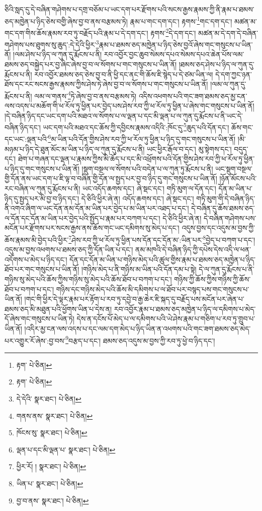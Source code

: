 ཅིའི་སླད་དུ་དེ་བཞིན་གཤེགས་པ་དགྲ་བཅོམ་པ་ཡང་དག་པར་རྫོགས་པའི་སངས་རྒྱས་རྣམས་ཀྱི་ནི་རྣམ་པ་ཐམས་ཅད་མཁྱེན་པ་ཉིད་ཅེས་བགྱི་ཞེས་བྱ་བ་ནས་བརྩམས་ཏེ། རྣམ་པ་གང་དག་དང་། རྟགས་\footnote{རྟག་  པེ་ཅིན། }གང་དག་དང་། མཚན་མ་གང་དག་གིས་ཆོས་རྣམས་རབ་ཏུ་བརྗོད་པའི་རྣམ་པ་དེ་དག་དང་། རྟགས་\footnote{རྟག་  པེ་ཅིན། }དེ་དག་དང་། མཚན་མ་དེ་དག་དེ་བཞིན་གཤེགས་པས་ཐུགས་སུ་ཆུད་:དེ་དེའི་ཕྱིར་\footnote{དེ་དེའི་  སྣར་ཐང་།  པེ་ཅིན། }རྣམ་པ་ཐམས་ཅད་མཁྱེན་པ་ཉིད་ཅེས་བྱའོ་ཞེས་གང་གསུངས་པ་ཡིན་ནོ། །ལམ་ཤེས་པ་ཉིད་ལ་ཀུན་དུ་རྨོངས་པ་ནི། རབ་འབྱོར་བྱང་ཆུབ་སེམས་དཔའ་སེམས་དཔའ་ཆེན་པོས་ལམ་ཐམས་ཅད་བསྐྱེད་པར་བྱ་ཞིང་ཞེས་བྱ་བ་ལ་སོགས་པ་གང་གསུངས་པ་ཡིན་ནོ། །ཐམས་ཅད་ཤེས་པ་ཉིད་ལ་ཀུན་དུ་རྨོངས་པ་ནི། རབ་འབྱོར་ཐམས་ཅད་ཅེས་བྱ་བ་ནི་ཕྱི་དང་ནང་གི་ཆོས་ཇི་སྙེད་པ་དེ་ཙམ་ཡིན་ལ། དེ་དག་ཀྱང་ཉན་ཐོས་དང་རང་སངས་རྒྱས་རྣམས་ཀྱིས་ཤེས་ཏེ་ཞེས་བྱ་བ་ལ་སོགས་པ་གང་གསུངས་པ་ཡིན་ནོ། །ལམ་ལ་ཀུན་དུ་རྨོངས་པ་ནི། ལམ་ལ་གནས་\footnote{གནས་ནས་  སྣར་ཐང་།  པེ་ཅིན། }ཏེ་ཞེས་བྱ་བ་ནས་བརྩམས་ཏེ། འདིས་འཕགས་པའི་གང་ཟག་ཐམས་ཅད་མྱ་ངན་ལས་འདས་པ་མཆོག་གི་ཕ་རོལ་ཏུ་ཕྱིན་པར་བྱེད་པས་ཤེས་རབ་ཀྱི་ཕ་རོལ་ཏུ་ཕྱིན་པ་ཞེས་གང་གསུངས་པ་ཡིན་ནོ། །དེ་བཞིན་ཉིད་དང་ཡང་དག་པའི་མཐའ་ལ་སོགས་པ་ལ་ལྡན་པ་དང་མི་ལྡན་པ་ལ་ཀུན་དུ་རྨོངས་པ་ནི་ཡང་དེ་བཞིན་ཉིད་དང་། ཡང་དག་པའི་མཐའ་དང་ཆོས་ཀྱི་དབྱིངས་རྣམས་འདིའི་:ཁོང་དུ་\footnote{ཁོངས་སུ་  སྣར་ཐང་།  པེ་ཅིན། }ཆུད་པའི་དོན་དང་། ཆོས་གང་དང་ཡང་:ལྡན་པའི་\footnote{ལྡན་པ་དང་མི་ལྡན་པ་  སྣར་ཐང་།  པེ་ཅིན། }མ་ཡིན་པའི་དོན་གྱིས་ཤེས་རབ་ཀྱི་ཕ་རོལ་ཏུ་ཕྱིན་པ་ཉིད་དུ་གང་གསུངས་པ་ཡིན་ནོ། །མི་མཉམ་པ་ཉིད་དེ་ཐུན་མོང་མ་ཡིན་པ་ཉིད་ལ་ཀུན་དུ་རྨོངས་པ་ནི། ཡང་ཕྱིར་རྒོལ་བ་དང་། མུ་སྟེགས་དང་། བདུད་དང་། ཐེག་པ་གཞན་དང་ལྡན་པ་རྣམས་ཀྱིས་མི་ཆོད་པ་དང་མི་འཕྲོགས་པའི་དོན་གྱིས་ཤེས་རབ་ཀྱི་ཕ་རོལ་ཏུ་ཕྱིན་པ་ཉིད་དུ་གང་གསུངས་པ་ཡིན་ནོ། །སྡུག་བསྔལ་ལ་སོགས་པའི་བདེན་པ་ལ་ཀུན་ཏུ་རྨོངས་པ་ནི། ཡང་སྡུག་བསྔལ་གྱི་དོན་ནས་ཡང་དག་པ་ཇི་ལྟ་བ་བཞིན་གྱི་དོན་ལ་སྤྱད་པར་བྱ་བ་ཉིད་དུ་གང་གསུངས་པ་ཡིན་ནོ། །ཉོན་མོངས་པའི་རང་བཞིན་ལ་ཀུན་དུ་རྨོངས་པ་ནི། ཡང་འདོད་ཆགས་དང་། ཞེ་སྡང་དང་། གཏི་མུག་ལ་དོན་དང་། དོན་མ་ཡིན་པ་ཉིད་དུ་སྤྱད་པར་མི་བྱ་བ་ཉིད་དང་། དེ་ཅིའི་ཕྱིར་ཞེ་ན། འདོད་ཆགས་དང་། ཞེ་སྡང་དང་། གཏི་མུག་གི་དེ་བཞིན་ཉིད་ནི་འགའ་ཞིག་ལ་ཡང་དོན་ནམ་དོན་མ་ཡིན་པར་བྱེད་པ་མ་ཡིན་པར་འཐད་པ་དང་། དེ་བཞིན་དུ་ཆོས་ཐམས་ཅད་ལ་དོན་དང་དོན་མ་ཡིན་པར་བྱེད་པའི་སྤྱོད་པ་རྣམ་པར་བཀག་པ་དང་། དེ་ཅིའི་ཕྱིར་ཞེ་ན། དེ་བཞིན་གཤེགས་པས་མངོན་པར་རྫོགས་པར་སངས་རྒྱས་ནས་ཆོས་གང་ཡང་དམིགས་སུ་མེད་པ་དང་། འདུས་བྱས་དང་འདུས་མ་བྱས་ཀྱི་ཆོས་རྣམས་མི་བྱེད་པའི་ཕྱིར་\footnote{ཕྱིར་རོ། །  སྣར་ཐང་།  པེ་ཅིན། }ཤེས་རབ་ཀྱི་ཕ་རོལ་ཏུ་ཕྱིན་པས་དོན་དང་དོན་མ་:ཡིན་པར་\footnote{ཡིན་པ་  སྣར་ཐང་།  པེ་ཅིན། }བྱེད་པ་བཀག་པ་དང་། འདུས་མ་བྱས་འཕགས་པ་ཐམས་ཅད་ཀྱི་དོན་ཡིན་པ་དང་། ནམ་མཁའི་དེ་བཞིན་ཉིད་ཀྱི་དཔེས་དེས་འདི་ལ་ཕན་འདོགས་པ་མེད་པ་ཉིད་དང་། དོན་དང་དོན་མ་ཡིན་པ་གཉིས་མེད་པའི་ཚུལ་གྱིས་རྣམ་པ་ཐམས་ཅད་མཁྱེན་པ་ཉིད་ཐོབ་པར་གང་གསུངས་པ་ཡིན་ནོ། །གཉིས་མེད་པ་ནི་གཉིས་མ་ཡིན་པའི་དོན་དམ་པ་སྟེ། དེ་ལ་ཀུན་དུ་རྨོངས་པ་ནི་གཉིས་སུ་མེད་པའི་ཆོས་ཀྱིས་གཉིས་སུ་མེད་པའི་ཆོས་ཐོབ་པ་བཀག་པ་དང་། གཉིས་ཀྱི་ཆོས་ཀྱིས་གཉིས་ཀྱི་ཆོས་ཐོབ་པ་བཀག་པ་དང་། གཉིས་དང་གཉིས་མེད་པའི་ཆོས་མི་དམིགས་པ་ལ་ཐོབ་པར་བསྙད་པས་གང་གསུངས་པ་ཡིན་ནོ། །གང་གི་ཕྱིར་དེ་ལྟར་རྣམ་པར་རྟོག་པ་རབ་ཏུ་དབྱེ་བ་རྒྱ་ཆེར་ཇི་སྐད་དུ་བརྗོད་པས་མངོན་པར་ཞེན་པ་ཐམས་ཅད་མི་མཐུན་པའི་ཕྱོགས་ཡིན་པ་དེས་ན། རབ་འབྱོར་རྣམ་པ་ཐམས་ཅད་མཁྱེན་པ་ཉིད་ལ་དམིགས་པ་མེད་དོ་ཞེས་གང་གསུངས་པ་ཡིན་ཏེ། དེས་ན་དངོས་པོ་མེད་པ་ལ་དམིགས་པའི་ཡེ་ཤེས་རྣམ་པ་གཅིག་པ་རབ་ཏུ་གྲུབ་པ་ཡིན་ནོ། །འདིར་མྱ་ངན་ལས་འདས་པ་དང་ལམ་དག་མེད་པ་ཉིད་ཡིན་ན་འཕགས་པའི་གང་ཟག་ཐམས་ཅད་མེད་པར་འགྱུར་རོ་ཞེས་:བྱ་བས་\footnote{བྱ་བ་ནས་  སྣར་ཐང་།  པེ་ཅིན། }བརྩད་པ་དང་། ཐམས་ཅད་འདུས་མ་བྱས་ཀྱི་རབ་ཏུ་ཕྱེ་བ་ཉིད་དང་། 